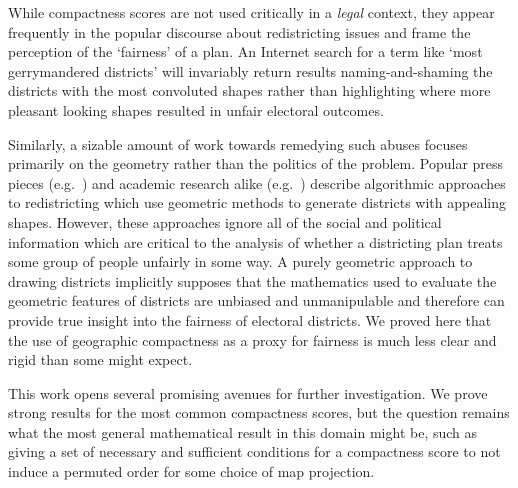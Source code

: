 While compactness scores are not used critically in a \textit{legal} context, they appear frequently in the popular discourse about redistricting issues and frame the perception of the \enquote*{fairness} of a plan.  An Internet search for a term like `most gerrymandered districts' will invariably return results naming-and-shaming the districts with the most convoluted shapes rather than highlighting where more pleasant looking shapes resulted in unfair electoral outcomes. 

Similarly, a sizable amount of work towards remedying such abuses focuses primarily on the geometry rather than the politics of the problem. Popular press pieces (e.g.\ \cite{ingraham2014solve}) and academic research alike (e.g.\ \cite{voronoi, svec2007applying, levin_friedler_2019}) describe algorithmic approaches to redistricting which use geometric methods to generate districts with appealing shapes.  
However, these approaches ignore all of the social and political information which are critical to the analysis of whether a districting plan treats some group of people unfairly in some way. 
A purely geometric approach to drawing districts implicitly supposes that the mathematics used to evaluate the geometric features of districts are unbiased and unmanipulable and therefore can provide true insight into the fairness of electoral districts.  We proved here that the use of geographic compactness as a proxy for fairness is much less clear and rigid than some might expect.




This work opens several promising avenues for further investigation.  We prove strong results for the most common compactness scores, but the question remains what the most general mathematical result in this domain might be, such as giving a set of necessary and sufficient conditions for a compactness score to not induce a permuted order for some choice of map projection.  